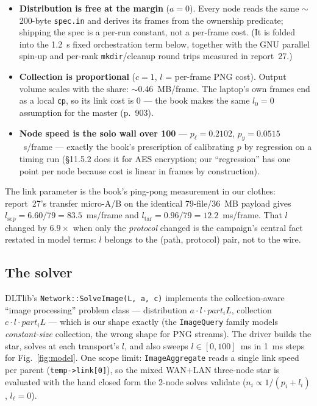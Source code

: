 \documentclass[
	english,
	letterpaper, oneside
]{article}
\begin{document}
\begin{itemize}
  \item \textbf{Distribution is free at the margin} ($a=0$). Every node
        reads the same $\sim$200-byte \texttt{spec.in} and derives its
        frames from the ownership predicate; shipping the spec is a
        per-run constant, not a per-frame cost. (It is folded into the
        1.2~s fixed orchestration term below, together with the GNU
        parallel spin-up and per-rank \texttt{mkdir}/cleanup round trips
        measured in report~27.)
  \item \textbf{Collection is proportional} ($c=1$, $l$ = per-frame PNG
        cost). Output volume scales with the share:
        $\sim$0.46~MB/frame. The laptop's own frames end as a local
        \texttt{cp}, so its link cost is 0 --- the book makes the same
        $l_0 = 0$ assumption for the master (p.~903).
  \item \textbf{Node speed is the solo wall over 100} ---
        $p_\ell = 0.2102$, $p_y = 0.0515$~s/frame --- exactly the book's
        prescription of calibrating $p$ by regression on a timing run
        (\S11.5.2 does it for AES encryption; our ``regression'' has one
        point per node because cost is linear in frames by construction).
\end{itemize}

The link parameter is the book's ping-pong measurement in our clothes:
report~27's transfer micro-A/B on the identical 79-file/36~MB payload
gives $l_{\mathrm{scp}} = 6.60/79 = 83.5$~ms/frame and
$l_{\mathrm{tar}} = 0.96/79 = 12.2$~ms/frame. That $l$ changed by
$6.9\times$ when only the \emph{protocol} changed is the campaign's
central fact restated in model terms: $l$ belongs to the (path, protocol)
pair, not to the wire.

\subsection{The solver}

DLTlib's \texttt{Network::SolveImage(L, a, c)} implements the
collection-aware ``image processing'' problem class --- distribution
$a \cdot l \cdot part_i L$, collection $c \cdot l \cdot part_i L$ ---
which is our shape exactly (the \texttt{ImageQuery} family models
\emph{constant-size} collection, the wrong shape for PNG streams). The
driver builds the star, solves at each transport's $l$, and also sweeps
$l \in [0, 100]$~ms in 1~ms steps for
Fig.~\ref{fig:model}. One scope limit: \texttt{ImageAggregate} reads a
single link speed per parent (\texttt{temp->link[0]}), so the mixed
WAN$+$LAN three-node star is evaluated with the hand closed form the
2-node solves validate ($n_i \propto 1/(p_i + l_i)$, $l_\ell = 0$).
\end{document}
